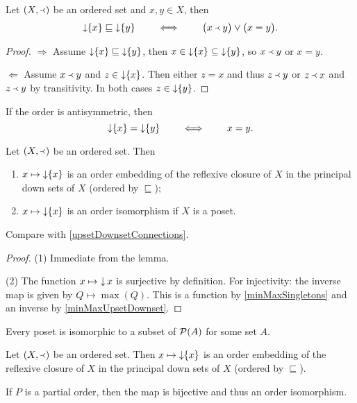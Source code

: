\begin{lemma} \label{orderingInitialSegments}
Let $\sSet{X,\Yleft}$ be an ordered set and $x,y\in X$, then
\[ \operatorname{\downarrow}\{x\} \sqsubseteq \operatorname{\downarrow}\{y\} \qquad\iff\qquad \big(x \Yleft y\big) \lor \big(x=y\big). \]
\end{lemma}
\begin{proof}
$\boxed{\Rightarrow}$ Assume $\operatorname{\downarrow}\{x\} \sqsubseteq \operatorname{\downarrow}\{y\}$, then $x\in \operatorname{\downarrow}\{x\} \subseteq \operatorname{\downarrow}\{y\}$, so $x\Yleft y$ or $x=y$.

$\boxed{\Leftarrow}$ Assume $x \Yleft y$ and $z\in \operatorname{\downarrow}\{x\}$. Then either $z=x$ and thus $z\Yleft y$ or $z\Yleft x$ and $z\Yleft y$ by transitivity. In both cases $z\in \operatorname{\downarrow}\{y\}$. 
\end{proof}
\begin{corollary}
If the order is antisymmetric, then
\[ \operatorname{\downarrow}\{x\} = \operatorname{\downarrow}\{y\} \qquad\iff\qquad x = y. \]
\end{corollary}
\begin{corollary} \label{principalDownsetEmbedding}
Let $\sSet{X,\Yleft}$ be an ordered set. Then
\begin{enumerate}
\item $x\mapsto \operatorname{\downarrow}\{x\}$ is an order embedding of the reflexive closure of $X$ in the principal down sets of $X$ (ordered by $\sqsubseteq$);
\item $x\mapsto \operatorname{\downarrow}\{x\}$ is an order isomorphism if $X$ is a poset.
\end{enumerate}
\end{corollary}
Compare with \ref{upsetDownsetConnections}.
\begin{proof}
(1) Immediate from the lemma.

(2) The function $x\mapsto \operatorname{\downarrow} x$ is surjective by definition. For injectivity: the inverse map is given by $Q\mapsto \max(Q)$. This is a function by \ref{minMaxSingletons} and an inverse by \ref{minMaxUpsetDownset}.
\end{proof}
\begin{corollary} \label{orderedSetPowerset}
Every poset is isomorphic to a subset of $\operatorname{\mathcal{P}}(A)$ for some set $A$. 
\end{corollary}
\begin{proposition} 
Let $\sSet{X,\Yleft}$ be an ordered set. Then $x\mapsto \operatorname{\downarrow}\{x\}$ is an order embedding of the reflexive closure of $X$ in the principal down sets of $X$ (ordered by $\sqsubseteq$).

If $P$ is a partial order, then the map is bijective and thus an order isomorphism.
\end{proposition}

